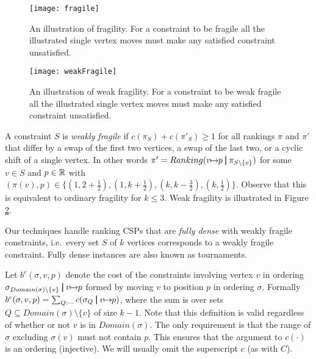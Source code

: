\documentclass[dvips,11pt,letter]{article}
\newcommand{\set}[1]{\{#1\}}                        \newcommand{\setof}[2]{\{\,{#1}\::\:{#2}\,\}}        \newcommand{\groupFrac}[2]{\left(\frac{#1}{#2}\right)}
\newcommand{\sm}{\setminus} \newcommand{\compl}[1]{\overline{#1}}                \newcommand{\floor}[1]{\left\lfloor #1 \right\rfloor}
\newcommand{\unaryOrdering}{\!\!\mapsto\!\!}
\newcommand{\bp}{\,\,\rule[-0.22em]{0.08em}{1em}\,\,} \newcommand{\restrictO}[2]{{#1}_{#2}}
\begin{document}
\begin{figure}[t]
\begin{center}
\texttt{[image: fragile]}
\end{center}
\caption{An illustration of fragility. For a constraint to be fragile all the illustrated single vertex moves must make any satisfied constraint unsatisfied.}
\label{fig:fragile}
\end{figure}

\begin{figure}[t]
\vspace{1.5em} \begin{center}
\texttt{[image: weakFragile]}
\end{center}
\caption{An illustration of weak fragility. For a constraint to be weak fragile all the illustrated single vertex moves must make any satisfied constraint unsatisfied.}
\label{fig:weakFragile}
\end{figure}

A constraint $S$ is \emph{weakly fragile} if $c(\restrictO{\pi}{S}) + c(\restrictO{\pi'}{S}) \ge 1$ for all rankings $\pi$ and $\pi'$ that differ by a swap of the first two vertices, a swap of the last two, or a cyclic shift of a single vertex. In other words $\pi' = Ranking(v \unaryOrdering p \bp \restrictO{\pi}{S \sm \set{v}})$ for some $v \in S$ and $p \in \mathbb{R}$ with $(\pi(v),p) \in \set{(1,2 + \frac{1}{2}),(1,k+\frac{1}{2}),(k,k-\frac{3}{2}),(k,\frac{1}{2})}$. Observe that this is equivalent to ordinary fragility for $k \le 3$. Weak fragility is illustrated in Figure \ref{fig:weakFragile}.

Our techniques handle ranking CSPs that are \emph{fully dense} with weakly fragile constraints, i.e.\ every set $S$ of $k$ vertices corresponds to a weakly fragile constraint. Fully dense instances are also known as tournaments.

Let $b^c(\sigma, v, p)$ denote the cost of the constraints involving vertex $v$ in ordering $\restrictO{\sigma}{Domain(\sigma) \sm \set{v}} \bp v \unaryOrdering p$ formed by moving $v$ to position $p$ in ordering $\sigma$. Formally $b^c(\sigma, v, p) = \sum_{Q : \cdots} c(\restrictO{\sigma}{Q} \bp v \unaryOrdering p)$, where the sum is over sets $Q \subseteq Domain(\sigma) \sm \set{v}$ of size $k-1$. Note that this definition is valid regardless of whether or not $v$ is in $Domain(\sigma)$. The only requirement is that the range of $\sigma$ excluding $\sigma(v)$ must not contain $p$. This ensures that the argument to $c(\cdot)$ is an ordering (injective). We will usually omit the superscript $c$ (as with $C$).
\end{document}
